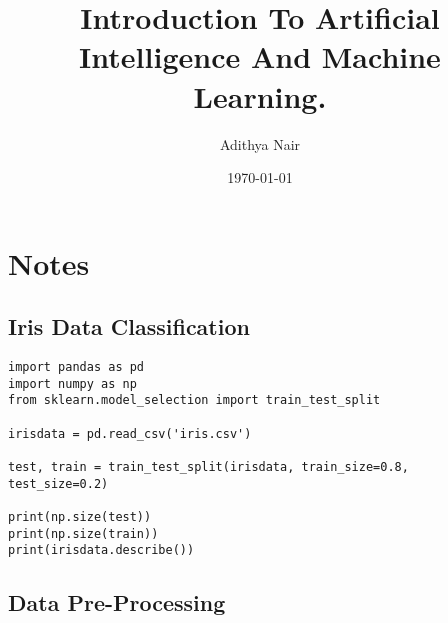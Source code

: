 \documentclass[11pt]{article}
\author{Adithya Nair}
\date{\today}
\title{Introduction To Artificial Intelligence And Machine Learning.}
\begin{document}
\maketitle
\tableofcontents

\section{Notes}
\label{sec:org3c42aef}
\subsection{Iris Data Classification}
\label{sec:orgb1e4785}
\begin{verbatim}
import pandas as pd
import numpy as np
from sklearn.model_selection import train_test_split

irisdata = pd.read_csv('iris.csv')

test, train = train_test_split(irisdata, train_size=0.8, test_size=0.2)

print(np.size(test))
print(np.size(train))
print(irisdata.describe())
\end{verbatim}
\subsection{Data Pre-Processing}
\label{sec:org9adb0f9}
\end{document}
